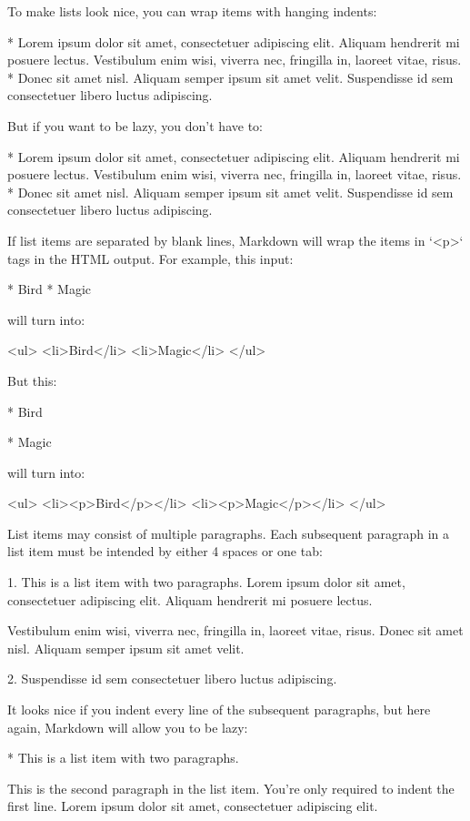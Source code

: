 To make lists look nice, you can wrap items with hanging indents:

    *   Lorem ipsum dolor sit amet, consectetuer adipiscing elit.
        Aliquam hendrerit mi posuere lectus. Vestibulum enim wisi,
        viverra nec, fringilla in, laoreet vitae, risus.
    *   Donec sit amet nisl. Aliquam semper ipsum sit amet velit.
        Suspendisse id sem consectetuer libero luctus adipiscing.

But if you want to be lazy, you don't have to:

    *   Lorem ipsum dolor sit amet, consectetuer adipiscing elit.
    Aliquam hendrerit mi posuere lectus. Vestibulum enim wisi,
    viverra nec, fringilla in, laoreet vitae, risus.
    *   Donec sit amet nisl. Aliquam semper ipsum sit amet velit.
    Suspendisse id sem consectetuer libero luctus adipiscing.

If list items are separated by blank lines, Markdown will wrap the
items in `<p>` tags in the HTML output. For example, this input:

    *   Bird
    *   Magic

will turn into:

    <ul>
    <li>Bird</li>
    <li>Magic</li>
    </ul>

But this:

    *   Bird

    *   Magic

will turn into:

    <ul>
    <li><p>Bird</p></li>
    <li><p>Magic</p></li>
    </ul>

List items may consist of multiple paragraphs. Each subsequent paragraph in a list item must be intended by either 4 spaces or one tab:

    1.  This is a list item with two paragraphs. Lorem ipsum dolor
        sit amet, consectetuer adipiscing elit. Aliquam hendrerit
        mi posuere lectus.

        Vestibulum enim wisi, viverra nec, fringilla in, laoreet
        vitae, risus. Donec sit amet nisl. Aliquam semper ipsum
        sit amet velit.

    2.  Suspendisse id sem consectetuer libero luctus adipiscing.

It looks nice if you indent every line of the subsequent paragraphs, but here again, Markdown will allow you to be lazy:

    *   This is a list item with two paragraphs.

        This is the second paragraph in the list item. You're
    only required to indent the first line. Lorem ipsum dolor
    sit amet, consectetuer adipiscing elit.

